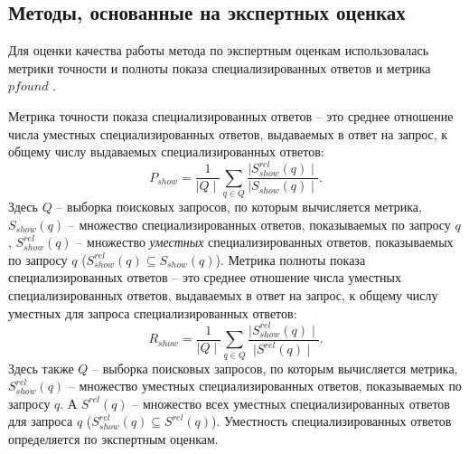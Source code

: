 \documentclass[12pt,a4paper]{report}
\newcommand*\card[1]{{\mid #1 \mid}}
\begin{document}
\subsection{Методы, основанные на экспертных оценках}

Для оценки качества работы метода по экспертным оценкам использовалась метрики точности и полноты показа специализированных ответов \cite{Metrics} и метрика $pfound$ \cite{PFound}. 

Метрика точности показа специализированных ответов -- это среднее отношение числа уместных специализированных ответов, выдаваемых в ответ на запрос, к общему числу выдаваемых специализированных ответов:
\begin{equation}
P_{show} = \frac{1}{\card{Q}} \sum \limits_{q \in Q} \frac{\card{S_{show}^{rel}(q)}}{\card{S_{show}(q)}}.
\end{equation}
Здесь $Q$ -- выборка поисковых запросов, по которым вычисляется метрика, $S_{show}(q)$ -- множество специализированных ответов, показываемых по запросу $q$, $S_{show}^{rel}(q)$ -- множество \emph{уместных} специализированных ответов, показываемых по запросу $q$ \linebreak ($S_{show}^{rel}(q) \subseteq S_{show}(q)$).
Метрика полноты показа специализированных ответов -- это среднее отношение числа уместных специализированных ответов, выдаваемых в ответ на запрос, к общему числу уместных для запроса специализированных ответов: 
\begin{equation}
R_{show} = \frac{1}{\card{Q}} \sum \limits_{q \in Q} \frac{\card{S_{show}^{rel}(q)}}{\card{S^{rel}(q)}}.
\end{equation}
Здесь также $Q$ -- выборка поисковых запросов, по которым вычисляется метрика, \linebreak $S_{show}^{rel}(q)$ -- множество уместных специализированных ответов, показываемых по запросу $q$. А $S^{rel}(q)$ -- множество всех уместных специализированных ответов для запроса $q$ ($S_{show}^{rel}(q) \subseteq S^{rel}(q)$). Уместность специализированных ответов определяется по экспертным оценкам.
\end{document}
